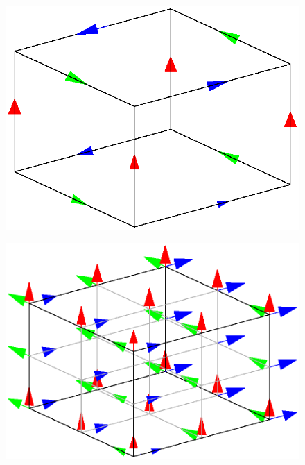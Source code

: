 \documentclass{report}
\begin{document}
\begin{figure}
\begin{minipage}{.5\textwidth}
  \centering
  \includegraphics[width=0.7\linewidth]{lfricdoc_figures/k0_W1_dofs.eps}
  \label{fig:k0w1}
\end{minipage}%
\begin{minipage}{.5\textwidth}
  \centering
  \includegraphics[width=0.7\linewidth]{lfricdoc_figures/k1_W1_dofs.eps}
  \label{fig:k1w1}
\end{minipage}


\end{figure}
\end{document}
